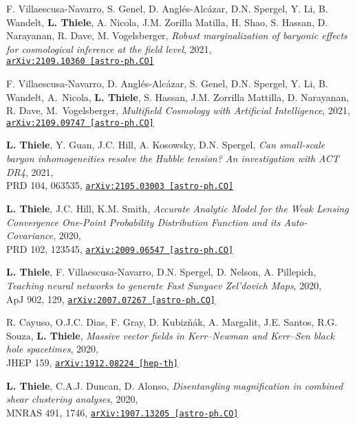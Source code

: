 F. Villaescusa-Navarro, S. Genel, D. Angl\'es-Alc\'azar, D.N. Spergel, Y. Li,
B. Wandelt, {\bf L. Thiele}, A. Nicola, J.M. Zorilla Matilla, H. Shao,
S. Hassan, D. Narayanan, R. Dave, M. Vogelsberger,
\emph{Robust marginalization of baryonic effects for cosmological inference
      at the field level}, 2021,\\
\href{https://arxiv.org/abs/2109.10360}{\mbox{\texttt{arXiv:2109.10360 [astro-ph.CO]}}}

F. Villaescusa-Navarro, D. Angl\'es-Alc\'azar, S. Genel, D.N. Spergel, Y. Li,
B. Wandelt, A.~Nicola, {\bf L. Thiele}, S. Hassan, J.M. Zorrilla Mattilla,
D. Narayanan, R. Dave, M.~Vogelsberger,
\emph{Multifield Cosmology with Artificial Intelligence}, 2021,\\
\href{https://arxiv.org/abs/2109.09747}{\mbox{\texttt{arXiv:2109.09747 [astro-ph.CO]}}}

{\bf L. Thiele}, Y. Guan, J.C. Hill, A. Kosowsky, D.N. Spergel,
\emph{Can small-scale baryon inhomogeneities resolve the Hubble tension?
      An investigation with ACT DR4}, 2021,\\
PRD 104, 063535,
\href{https://arxiv.org/abs/2105.03003}{\mbox{\texttt{arXiv:2105.03003 [astro-ph.CO]}}}

{\bf L. Thiele}, J.C. Hill, K.M. Smith,
\emph{Accurate Analytic Model for the Weak Lensing Convergence One-Point Probability
      Distribution Function and its Auto-Covariance}, 2020,\\
PRD 102, 123545,
\href{https://arxiv.org/abs/2009.06547}{\mbox{\texttt{arXiv:2009.06547 [astro-ph.CO]}}}

{\bf L. Thiele}, F. Villaescusa-Navarro, D.N. Spergel, D. Nelson, A. Pillepich,
\emph{Teaching neural networks to generate Fast Sunyaev Zel'dovich Maps}, 2020,\\
ApJ 902, 129,
\href{https://arxiv.org/abs/2007.07267}{\mbox{\texttt{arXiv:2007.07267 [astro-ph.CO]}}}

R. Cayuso, O.J.C. Dias, F. Gray, D. Kubiz\v{n}\'{a}k, A. Margalit, J.E. Santos,
R.G. Souza, {\bf L. Thiele},
\emph{Massive vector fields in Kerr--Newman and Kerr--Sen black hole spacetimes}, 2020,\\
JHEP 159,
\href{https://arxiv.org/abs/1912.08224}{\mbox{\texttt{arXiv:1912.08224 [hep-th]}}}

{\bf L. Thiele}, C.A.J. Duncan, D. Alonso,
\emph{Disentangling magnification in combined shear clustering analyses}, 2020,\\
MNRAS 491, 1746,
\href{https://arxiv.org/abs/1907.13205}{\mbox{\texttt{arXiv:1907.13205 [astro-ph.CO]}}}

